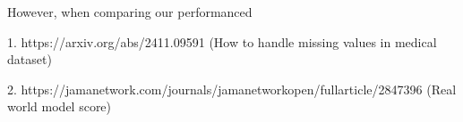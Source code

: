 \documentclass{article}
\begin{document}
However, when comparing our performanced 


\medskip

\small



1. https://arxiv.org/abs/2411.09591 (How to handle missing values in medical dataset)

2. https://jamanetwork.com/journals/jamanetworkopen/fullarticle/2847396 (Real world model score)

\end{document}
